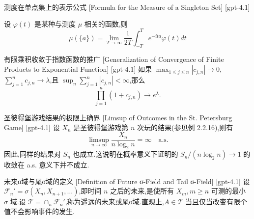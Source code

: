 \documentclass[UTF8]{ctexart}
\begin{document}
    
    
    \begin{thm}
        {测度在单点集上的表示公式}
        [Formula for the Measure of a Singleton Set]
        [gpt-4.1]
        
设 $\varphi(t)$ 是某种与测度 $\mu$ 相关的函数,则
\[
\mu(\{a\}) = \lim_{T \to \infty} \frac{1}{2T} \int_{-T}^{T} e^{-ita} \varphi(t) dt
\]

    \end{thm}
    
    
    
    \begin{lma}
        {有限乘积收敛于指数函数的推广}
        [Generalization of Convergence of Finite Products to Exponential Function]
        [gpt-4.1]
        如果 $\max_{1 \leq j \leq n} |c_{j,n}| \to 0$,$\sum_{j=1}^n c_{j,n} \to \lambda$,且 $\sup_n \sum_{j=1}^n |c_{j,n}| < \infty$,那么
\[
\prod_{j=1}^n (1 + c_{j,n}) \to e^{\lambda} .
\]

    \end{lma}
    
    
    
    \begin{thm}
        {圣彼得堡游戏结果的极限上确界}
        [Limsup of Outcomes in the St. Petersburg Game]
        [gpt-4.1]
        设 $X_n$ 是圣彼得堡游戏第 $n$ 次玩的结果(参见例 2.2.16),则有
\[
\limsup_{n \to \infty} \frac{X_n}{n \log_2 n} = \infty \quad \text{a.s.}
\]
因此,同样的结果对 $S_n$ 也成立.这说明在概率意义下证明的 $S_n/(n \log_2 n) \to 1$ 的收敛在 a.s. 意义下并不成立.

    \end{thm}
    
    
    
    \begin{dfn}
        {未来σ域与尾σ域的定义}
        [Definition of Future σ-Field and Tail σ-Field]
        [gpt-4.1]
        设 $\mathcal{F}_n' = \sigma(X_n, X_{n+1}, \ldots)$,即时间 $n$ 之后的未来,是使所有 $X_m, m \geq n$ 可测的最小 $\sigma$ 域.设 $\mathcal{T} = \cap_n \mathcal{F}_n'$,称为遥远的未来或尾σ域.直观上,$A \in \mathcal{T}$ 当且仅当改变有限个值不会影响事件的发生.
    \end{dfn}
    
    
    
\end{document}
